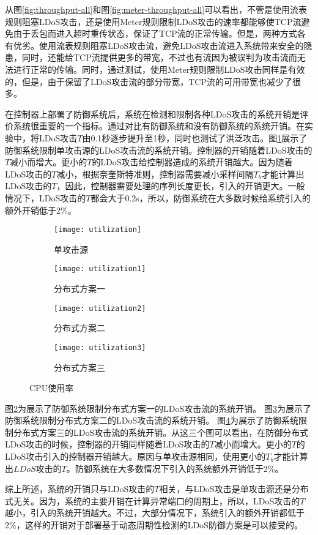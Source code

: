 从图\ref{fig:throughput-all}和图\ref{fig:meter-throughput-all}可以看出，不管是使用流表规则阻塞LDoS攻击，还是使用Meter规则限制LDoS攻击的速率都能够使TCP流避免由于丢包而进入超时重传状态，保证了TCP流的正常传输。但是，两种方式各有优劣。使用流表规则阻塞LDoS攻击流，避免LDoS攻击流进入系统带来安全的隐患，同时，还能给TCP流提供更多的带宽，不过也有流因为被误判为攻击流而无法进行正常的传输。同时，通过测试，使用Meter规则限制LDoS攻击同样是有效的，但是，由于保留了LDoS攻击流的部分带宽，TCP流的可用带宽也减少了很多。

在控制器上部署了防御系统后，系统在检测和限制各种LDoS攻击的系统开销是评价系统很重要的一个指标。通过对比有防御系统和没有防御系统的系统开销。在实验中，将LDoS攻击$T$由0.1秒逐步提升至1秒，同时也测试了洪泛攻击。图\ref{fig:CPU-single}展示了防御系统限制单攻击源的LDoS攻击流的系统开销。控制器的开销随着LDoS攻击的$T$减小而增大。更小的$T$的LDoS攻击给控制器造成的系统开销越大。因为随着LDoS攻击的$T$减小，根据奈奎斯特准则，控制器需要减小采样间隔$T_b$才能计算出LDoS攻击的$T$，因此，控制器需要处理的序列长度更长，引入的开销更大。一般情况下，LDoS攻击的$T$都会大于0.2s，所以，防御系统在大多数时候给系统引入的额外开销低于2\%。

\begin{figure}
    \begin{subfigure}{.49\textwidth}
        \centering
        \texttt{[image: utilization]}
        \caption{单攻击源}
        \label{fig:CPU-single}
    \end{subfigure}
    \begin{subfigure}{.49\textwidth}
        \centering
        \texttt{[image: utilization1]}
        \caption{分布式方案一}
        \label{fig:CPU-2h-mod1}
    \end{subfigure}

    \begin{subfigure}{.49\textwidth}
        \centering
        \texttt{[image: utilization2]}
        \caption{分布式方案二}
        \label{fig:CPU-2h-mod2}
    \end{subfigure}
    \begin{subfigure}{.49\textwidth}
        \centering
        \texttt{[image: utilization3]}
        \caption{分布式方案三}
        \label{fig:CPU-2h-mod3}
    \end{subfigure}


    \caption{CPU使用率}
    \label{fig:CPU-all}
\end{figure}

图\ref{fig:CPU-2h-mod1}为展示了防御系统限制分布式方案一的LDoS攻击流的系统开销。
图\ref{fig:CPU-2h-mod2}为展示了防御系统限制分布式方案二的LDoS攻击流的系统开销。
图\ref{fig:CPU-2h-mod3}为展示了防御系统限制分布式方案三的LDoS攻击流的系统开销。从这三个图可以看出，在防御分布式LDoS攻击的时候，控制器的开销同样随着LDoS攻击的$T$减小而增大。更小的$T$的LDoS攻击引入的控制器开销越大。原因与单攻击源相同，使用更小的$T_b$才能计算出$LDoS$攻击的$T$。防御系统在大多数情况下引入的系统额外开销低于2\%。

综上所述，系统的开销只与LDoS攻击的$T$相关，与LDoS攻击是单攻击源还是分布式无关。因为，系统的主要开销在计算异常端口的周期上，所以，LDoS攻击的$T$越小，引入的系统开销越大。不过，大部分情况下，系统引入的额外开销都低于2\%，这样的开销对于部署基于动态周期性检测的LDoS防御方案是可以接受的。